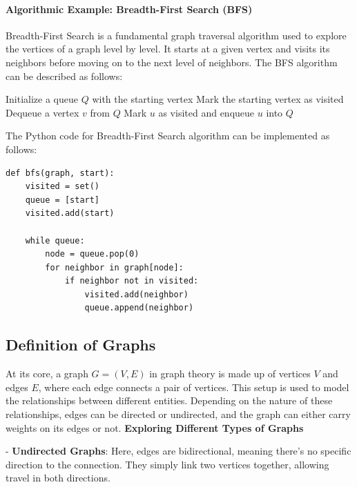 \documentclass[12pt]{book} %
\begin{document}
\paragraph{Algorithmic Example: Breadth-First Search (BFS)}
\FloatBarrier
Breadth-First Search is a fundamental graph traversal algorithm used to explore the vertices of a graph level by level. It starts at a given vertex and visits its neighbors before moving on to the next level of neighbors.
\FloatBarrier
The BFS algorithm can be described as follows:
\FloatBarrier
\begin{algorithm}
\caption{Breadth-First Search}
\begin{algorithmic}
\State Initialize a queue $Q$ with the starting vertex
\State Mark the starting vertex as visited
    \State Dequeue a vertex $v$ from $Q$
            \State Mark $u$ as visited and enqueue $u$ into $Q$
        \EndIf
    \EndFor
\EndWhile
\end{algorithmic}
\end{algorithm}
\FloatBarrier
The Python code for Breadth-First Search algorithm can be implemented as follows:
\FloatBarrier
\begin{lstlisting}
def bfs(graph, start):
    visited = set()
    queue = [start]
    visited.add(start)
    
    while queue:
        node = queue.pop(0)
        for neighbor in graph[node]:
            if neighbor not in visited:
                visited.add(neighbor)
                queue.append(neighbor)
\end{lstlisting}


\subsection{Definition of Graphs}

At its core, a graph \( G = (V, E) \) in graph theory is made up of vertices \( V \) and edges \( E \), where each edge connects a pair of vertices. This setup is used to model the relationships between different entities. Depending on the nature of these relationships, edges can be directed or undirected, and the graph can either carry weights on its edges or not.
\newline
\newline
{\textbf{Exploring Different Types of Graphs}}


\FloatBarrier
- \textbf{Undirected Graphs}: Here, edges are bidirectional, meaning there's no specific direction to the connection. They simply link two vertices together, allowing travel in both directions.
\end{document}
